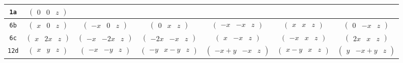 \documentclass[fleqn,9pt,landscape]{jsarticle}
\begin{document}
\begin{center}
\begin{longtable}{ccccccc}
{\tt 1a} & $ \begin{pmatrix} 0 & 0 & z \end{pmatrix} $ & $  $ & $  $ & $  $ & $  $ & $  $ \\ \hline
{\tt 6b} & $ \begin{pmatrix} x & 0 & z \end{pmatrix} $ & $ \begin{pmatrix} - x & 0 & z \end{pmatrix} $ & $ \begin{pmatrix} 0 & x & z \end{pmatrix} $ & $ \begin{pmatrix} - x & - x & z \end{pmatrix} $ & $ \begin{pmatrix} x & x & z \end{pmatrix} $ & $ \begin{pmatrix} 0 & - x & z \end{pmatrix} $ \\ \hline
{\tt 6c} & $ \begin{pmatrix} x & 2 x & z \end{pmatrix} $ & $ \begin{pmatrix} - x & - 2 x & z \end{pmatrix} $ & $ \begin{pmatrix} - 2 x & - x & z \end{pmatrix} $ & $ \begin{pmatrix} x & - x & z \end{pmatrix} $ & $ \begin{pmatrix} - x & x & z \end{pmatrix} $ & $ \begin{pmatrix} 2 x & x & z \end{pmatrix} $ \\ \hline
{\tt 12d} & $ \begin{pmatrix} x & y & z \end{pmatrix} $ & $ \begin{pmatrix} - x & - y & z \end{pmatrix} $ & $ \begin{pmatrix} - y & x - y & z \end{pmatrix} $ & $ \begin{pmatrix} - x + y & - x & z \end{pmatrix} $ & $ \begin{pmatrix} x - y & x & z \end{pmatrix} $ & $ \begin{pmatrix} y & - x + y & z \end{pmatrix} $ \\

\end{longtable}
\end{center}
\end{document}

